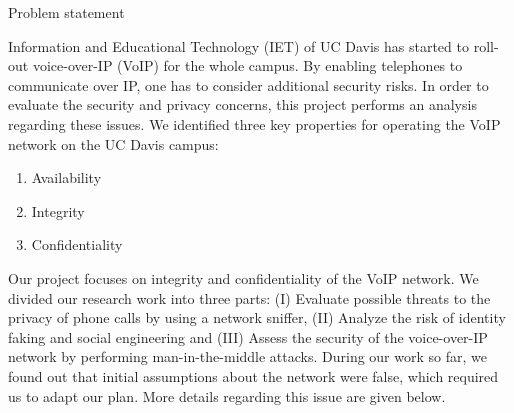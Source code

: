 Problem statement

Information and Educational Technology (IET) of UC Davis has started to roll-out voice-over-IP (VoIP) for the whole campus. By enabling telephones to communicate over IP, one has to consider additional security risks. In order to evaluate the security and privacy concerns, this project performs an analysis regarding these issues. We identified three key properties for operating the VoIP network on the UC Davis campus:

\begin{enumerate}
\item Availability
\item Integrity
\item Confidentiality
\end{enumerate}

Our project focuses on integrity and confidentiality of the VoIP network. We divided our research work into three parts: (I) Evaluate possible threats to the privacy of phone calls by using a network sniffer, (II) Analyze the risk of identity faking and social engineering and (III) Assess the security of the voice-over-IP network by performing man-in-the-middle attacks. During our work so far, we found out that initial assumptions about the network were false, which required us to adapt our plan. More details regarding this issue are given below.